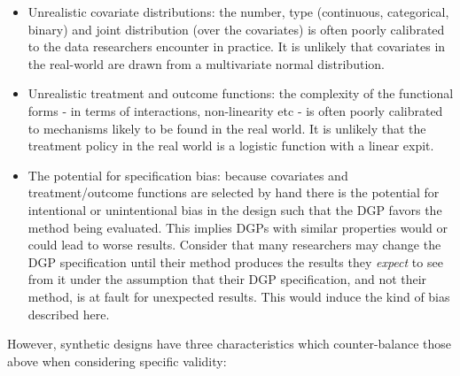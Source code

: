 \documentclass[../main.tex]{subfiles}
\begin{document}
\vspace{\baselineskip}
\begin{itemize}
	\item Unrealistic covariate distributions: the number, type (continuous, categorical, binary) and joint distribution (over the covariates) is often poorly calibrated to the data researchers encounter in practice. It is unlikely that covariates in the real-world are drawn from a multivariate normal distribution.\par


\vspace{\baselineskip}
	\item Unrealistic treatment and outcome functions: the complexity of the functional forms - in terms of interactions, non-linearity etc - is often poorly calibrated to mechanisms likely to be found in the real world. It is unlikely that the treatment policy in the real world is a logistic function with a linear expit.\par


\vspace{\baselineskip}
	\item The potential for specification bias: because covariates and treatment/outcome functions are selected by hand there is the potential for intentional or unintentional bias in the design such that the DGP favors the method being evaluated. This implies DGPs with similar properties would or could lead to worse results. Consider that many researchers may change the DGP specification until their method produces the results they \textit{expect} to see from it under the assumption that their DGP specification, and not their method, is at fault for unexpected results. This would induce the kind of bias described here.
\end{itemize}\par


\vspace{\baselineskip}
However, synthetic designs have three characteristics which counter-balance those above when considering specific validity:\par
\end{document}
